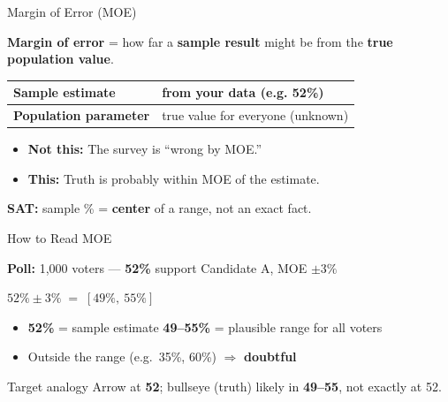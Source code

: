 \documentclass{beamer}
\begin{document}
\begin{frame}{Margin of Error (MOE)}
\small

\textbf{Margin of error} = how far a \textbf{sample result} might be from the \textbf{true population value}.

\vspace{0.2cm}
\begin{center}
\begin{tabular}{|l|l|}
\hline
\textbf{Sample estimate} & from your data (e.g. 52\%) \\
\hline
\textbf{Population parameter} & true value for everyone (unknown) \\
\hline
\end{tabular}
\end{center}

\vspace{0.15cm}
\begin{itemize}
    \item \textbf{Not this:} The survey is ``wrong by MOE.''
    \item \textbf{This:} Truth is probably within MOE of the estimate.
\end{itemize}

\vspace{0.05cm}
\textbf{SAT:} sample \% = \textbf{center} of a range, not an exact fact.

\end{frame}

\begin{frame}{How to Read MOE}
\small

\textbf{Poll:} 1{,}000 voters — \textbf{52\%} support Candidate A, MOE \textbf{$\pm 3\%$}

\vspace{0.15cm}
\begin{center}
\Large
$52\% \pm 3\% \;=\; [49\%,\ 55\%]$
\end{center}

\vspace{0.1cm}
\begin{itemize}
    \item \textbf{52\%} = sample estimate \hfill \textbf{49–55\%} = plausible range for all voters
    \item Outside the range (e.g.\ 35\%, 60\%) $\Rightarrow$ \textbf{doubtful}
\end{itemize}

\vspace{0.1cm}
\begin{block}{Target analogy}
Arrow at \textbf{52}; bullseye (truth) likely in \textbf{49–55}, not exactly at 52.
\end{block}

\end{frame}
\end{document}
